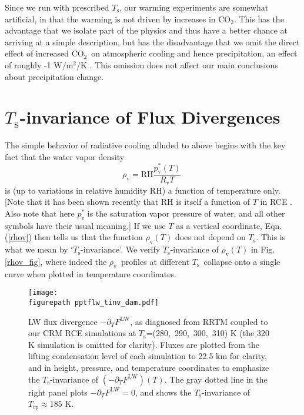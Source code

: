 \documentclass[10pt]{article}
\newcommand{\beqn}{\begin{equation}}
\newcommand{\eeqn}{\end{equation}}
\newcommand{\eqnref}[1]{(\ref{#1})}
\newcommand{\ppt}{\ensuremath{\partial_T}}
\newcommand{\cotwo}{\ensuremath{\mathrm{CO_2}}}
\newcommand{\FLW}{\ensuremath{F^\mathrm{LW}}}
\newcommand{\Wmsq}{\ensuremath{\mathrm{W/m^2}}}
\newcommand{\rhov}{\ensuremath{\rho_\mathrm{v}}}
\newcommand{\Rv}{\ensuremath{R_\mathrm{v}}}
\newcommand{\pvstar}{\ensuremath{p^*_{\mathrm{v}}}}
\newcommand{\Ts}{\ensuremath{T_\mathrm{s}}}
\newcommand{\RH}{\ensuremath{\mathrm{RH}}}
\newcommand{\Ttp}{\ensuremath{T_\mathrm{tp}}}
\newcommand{\figurepath}{../figures/}
\begin{document}
Since we run with prescribed \Ts, our warming experiments are somewhat artificial, in that the warming is not driven by increases in \cotwo. This has the advantage that we isolate part of the physics and thus have a better chance at arriving at a simple description, but has the disadvantage that we omit the direct effect of increased \cotwo\ on atmospheric cooling and hence precipitation, an effect of roughly -1 \Wmsq/K \citep{pendergrass2014}. This omission does not affect our main conclusions about precipitation change.



\section{\Ts-invariance of Flux Divergences}
\label{Ts_invariance}
The simple behavior of radiative cooling alluded to above begins with the key fact that  the water vapor density 
	\beqn
		\rhov =  \RH\frac{\pvstar(T)}{\Rv T} \; 
	\label{rhov}
	\eeqn
	 is (up to variations in relative humidity \RH) a function of temperature only. [Note that it has been shown recently that RH is itself a function of $T$ in RCE \citep{romps2014}. Also note that here $p_v^*$  is the saturation vapor pressure of water, and all other symbols have their usual meaning.] If we use $T$ as a vertical coordinate,  Eqn. \eqnref{rhov} then tells us that the function $\rhov(T)$ does not depend on \Ts. This is what we mean by `\Ts-invariance'. We verify \Ts-invariance of $\rhov(T)$  in Fig. \ref{rhov_fig}, where indeed  the \rhov\ profiles at different \Ts\ collapse onto a single curve when plotted in temperature coordinates.


\begin{figure}[t]
	\begin{center}
			\texttt{[image: \\figurepath pptflw\_tinv\_dam.pdf]}
		\caption{LW flux divergence  $-\ppt \FLW$, as diagnosed from RRTM coupled to our CRM RCE simulations at \Ts=(280,\ 290,\ 300,\ 310) K (the 320 K simulation is omitted for clarity). Fluxes are plotted from the lifting condensation level of each simulation to 22.5 km for clarity, and  in height, pressure, and temperature coordinates to emphasize the \Ts-invariance of  $(-\ppt \FLW)(T)$. The gray dotted line in the right panel plots $-\ppt \FLW = 0$, and shows the \Ts-invariance of $\Ttp \approx 185$ K.
		\label{pptflw_tinv_dam}
		}
	\end{center}
\end{figure}
\end{document}
